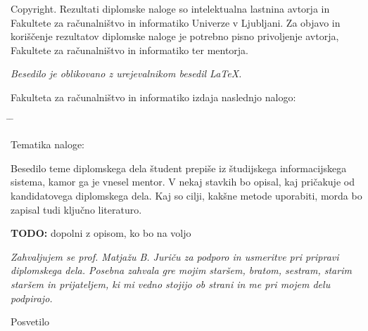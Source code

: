 \documentclass[a4paper, 12pt]{book}
\newcommand{\clearemptydoublepage}{\newpage{\pagestyle{empty}\cleardoublepage}}
\begin{document}
\noindent
{\sc Copyright}. 
Rezultati diplomske naloge so intelektualna lastnina avtorja in Fakultete za računalništvo in informatiko Univerze v Ljubljani.
Za objavo in koriščenje rezultatov diplomske naloge je potrebno pisno privoljenje avtorja, Fakultete za računalništvo in informatiko ter mentorja.

\begin{center}
\mbox{}\vfill
\emph{Besedilo je oblikovano z urejevalnikom besedil \LaTeX.}
\end{center}
\clearemptydoublepage

\thispagestyle{empty}
\vspace*{4cm}

\noindent
Fakulteta za računalništvo in informatiko izdaja naslednjo nalogo:
\medskip
\begin{tabbing}
\hspace{32mm}\= \hspace{6cm} \= \kill




Tematika naloge:
\end{tabbing}
Besedilo teme diplomskega dela študent prepiše iz študijskega informacijskega sistema, kamor ga je vnesel mentor. V nekaj stavkih bo opisal, kaj pričakuje od kandidatovega diplomskega dela. Kaj so cilji, kakšne metode uporabiti, morda bo zapisal tudi ključno literaturo.

\textbf{TODO:} dopolni z opisom, ko bo na voljo
\vspace{15mm}



\vspace{2cm}

\clearemptydoublepage

\thispagestyle{empty}\mbox{}\vfill\null\it%
\noindent
Zahvaljujem se prof. Matjažu B. Juriču za podporo in usmeritve pri pripravi diplomskega dela. Posebna zahvala gre mojim staršem, bratom, sestram, starim staršem in prijateljem, ki mi vedno stojijo ob strani in me pri mojem delu podpirajo.
\rm\normalfont

\clearemptydoublepage

\thispagestyle{empty}\mbox{}{\textheight}\mbox{}\hfill\begin{minipage}{0.55\textwidth}%
Posvetilo
\normalfont\end{minipage}
\end{document}
